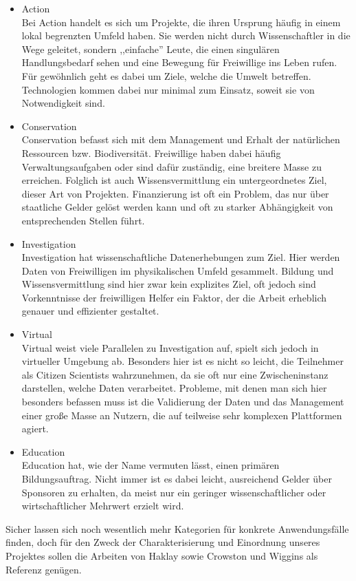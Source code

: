 \documentclass{article}
\begin{document}
\begin{itemize}
\item{Action\\
Bei Action handelt es sich um Projekte, die ihren Ursprung häufig in einem lokal begrenzten Umfeld haben.
Sie werden nicht durch Wissenschaftler in die Wege geleitet,
sondern ,,einfache'' Leute, die einen singulären Handlungsbedarf sehen und eine Bewegung für Freiwillige ins Leben rufen.
Für gewöhnlich geht es dabei um Ziele, welche die Umwelt betreffen.
Technologien kommen dabei nur minimal zum Einsatz, soweit sie von Notwendigkeit sind.}
\item{Conservation\\
Conservation befasst sich mit dem Management und Erhalt der natürlichen Ressourcen bzw. Biodiversität.
Freiwillige haben dabei häufig Verwaltungsaufgaben oder sind dafür zuständig, eine breitere Masse zu erreichen.
Folglich ist auch Wissensvermittlung ein untergeordnetes Ziel, dieser Art von Projekten.
Finanzierung ist oft ein Problem, das nur über staatliche Gelder gelöst werden kann und oft 
zu starker Abhängigkeit von entsprechenden Stellen führt.}
\item{Investigation\\
Investigation hat wissenschaftliche Datenerhebungen zum Ziel.
Hier werden Daten von Freiwilligen im physikalischen Umfeld gesammelt.
Bildung und Wissensvermittlung sind hier zwar kein explizites Ziel, oft jedoch sind Vorkenntnisse der freiwilligen Helfer ein Faktor,
der die Arbeit erheblich genauer und effizienter gestaltet.}
\item{Virtual\\
Virtual weist viele Parallelen zu Investigation auf, spielt sich jedoch in virtueller Umgebung ab.
Besonders hier ist es nicht so leicht, die Teilnehmer als Citizen Scientists wahrzunehmen, da sie oft nur eine Zwischeninstanz darstellen, 
welche Daten verarbeitet.
Probleme, mit denen man sich hier besonders befassen muss ist die Validierung der Daten und das Management 
einer große Masse an Nutzern, die auf teilweise sehr komplexen Plattformen agiert.}
\item{Education\\
Education hat, wie der Name vermuten lässt, einen primären Bildungsauftrag.
Nicht immer ist es dabei leicht, ausreichend Gelder über Sponsoren zu erhalten, da meist nur ein geringer wissenschaftlicher oder
wirtschaftlicher Mehrwert erzielt wird.}
\end{itemize}
Sicher lassen sich noch wesentlich mehr Kategorien für konkrete Anwendungsfälle finden,
doch für den Zweck der Charakterisierung und Einordnung unseres Projektes sollen die Arbeiten von Haklay sowie Crowston und Wiggins als 
Referenz genügen.
\end{document}
